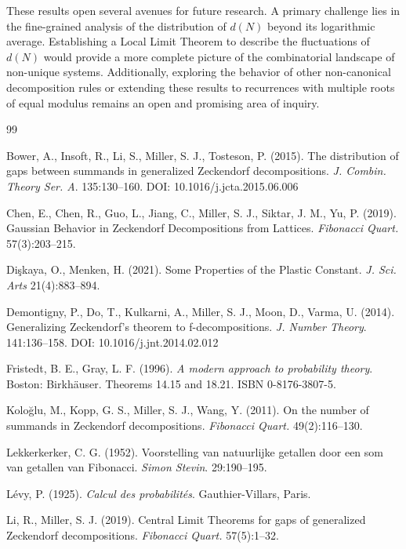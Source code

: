 \documentclass[11pt]{amsart}
\theoremstyle{plain}
\numberwithin{equation}{section} %
\numberwithin{table}{section} %
\numberwithin{figure}{section}
\begin{document}
	These results open several avenues for future research. A primary challenge lies in the fine-grained analysis of the distribution of $d(N)$ beyond its logarithmic average. Establishing a Local Limit Theorem to describe the fluctuations of $d(N)$ would provide a more complete picture of the combinatorial landscape of non-unique systems. Additionally, exploring the behavior of other non-canonical decomposition rules or extending these results to recurrences with multiple roots of equal modulus remains an open and promising area of inquiry.
	\begin{thebibliography}{99}
		
		Bower, A., Insoft, R., Li, S., Miller, S. J., Tosteson, P. (2015). The distribution of gaps between summands in generalized {Z}eckendorf decompositions. \textit{J. Combin. Theory Ser. A}. 135:130--160. DOI: 10.1016/j.jcta.2015.06.006
		
		Chen, E., Chen, R., Guo, L., Jiang, C., Miller, S. J., Siktar, J. M., Yu, P. (2019). Gaussian {B}ehavior in {Z}eckendorf {D}ecompositions from {L}attices. \textit{Fibonacci Quart.} 57(3):203--215.
		
		
		Dişkaya, O., Menken, H. (2021). Some Properties of the Plastic Constant. \textit{J. Sci. Arts} 21(4):883--894.
		
		Demontigny, P., Do, T., Kulkarni, A., Miller, S. J., Moon, D., Varma, U. (2014). Generalizing {Z}eckendorf's theorem to f-decompositions. \textit{J. Number Theory}. 141:136--158. DOI: 10.1016/j.jnt.2014.02.012
		
		Fristedt, B. E., Gray, L. F. (1996). \textit{A modern approach to probability theory}. Boston: Birkhäuser. Theorems 14.15 and 18.21. ISBN 0-8176-3807-5.
		
		
		Kolo{\u{g}}lu, M., Kopp, G. S., Miller, S. J., Wang, Y. (2011). On the number of summands in {Z}eckendorf decompositions. \textit{Fibonacci Quart.} 49(2):116--130.
		
		Lekkerkerker, C. G. (1952). Voorstelling van natuurlijke getallen door een som van getallen van {F}ibonacci. \textit{Simon Stevin}. 29:190--195.
		
		Lévy, P. (1925). \textit{Calcul des probabilités}. Gauthier-Villars, Paris.
		
		Li, R., Miller, S. J. (2019). Central {L}imit {T}heorems for gaps of generalized {Z}eckendorf decompositions. \textit{Fibonacci Quart.} 57(5):1--32.
		

\end{thebibliography}
\end{document}
